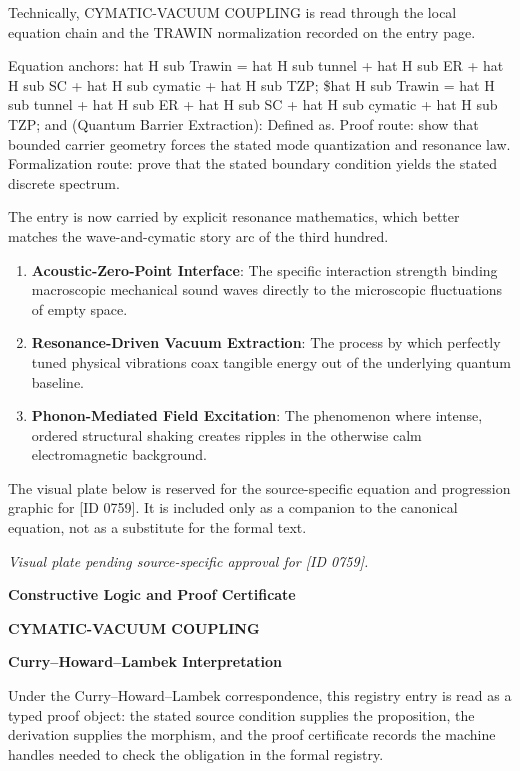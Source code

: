 Technically, CYMATIC-VACUUM COUPLING is read through the local equation chain and the TRAWIN normalization recorded on the entry page.

Equation anchors: hat H sub Trawin = hat H sub tunnel + hat H sub ER + hat H sub SC + hat H sub cymatic + hat H sub TZP; \$hat H sub Trawin = hat H sub tunnel + hat H sub ER + hat H sub SC + hat H sub cymatic + hat H sub TZP; and (Quantum Barrier Extraction): Defined as. Proof route: show that bounded carrier geometry forces the stated mode quantization and resonance law. Formalization route: prove that the stated boundary condition yields the stated discrete spectrum.

The entry is now carried by explicit resonance mathematics, which better matches the wave-and-cymatic story arc of the third hundred.
\endgroup

\begin{enumerate}[leftmargin=1.6em,itemsep=6pt,topsep=4pt]
\item \textbf{Acoustic-Zero-Point Interface}: The specific interaction strength binding macroscopic mechanical sound waves directly to the microscopic fluctuations of empty space.
\item \textbf{Resonance-Driven Vacuum Extraction}: The process by which perfectly tuned physical vibrations coax tangible energy out of the underlying quantum baseline.
\item \textbf{Phonon-Mediated Field Excitation}: The phenomenon where intense, ordered structural shaking creates ripples in the otherwise calm electromagnetic background.
\end{enumerate}

\begingroup\footnotesize\sloppy
The visual plate below is reserved for the source-specific equation and progression graphic for [ID 0759]. It is included only as a companion to the canonical equation, not as a substitute for the formal text.
\par\endgroup
\begingroup\footnotesize\itshape
Visual plate pending source-specific approval for [ID 0759].
\par\endgroup

\clearpage
\begingroup\tzpsupportsetup
\noindent\textbf{\fontsize{10.8pt}{12.8pt}\selectfont [ID 0759] Constructive Logic and Proof Certificate}\par
\noindent\textbf{\fontsize{10pt}{12pt}\selectfont CYMATIC-VACUUM COUPLING}\par
\vspace{0.45em}
\begingroup
\footnotesize
\setlength{\parskip}{0.22em}
\setlength{\parindent}{0pt}
\noindent\textbf{Curry--Howard--Lambek Interpretation}\par
Under the Curry--Howard--Lambek correspondence, this registry entry is read as a typed proof
object: the stated source condition supplies the proposition, the derivation supplies the
morphism, and the proof certificate records the machine handles needed to check the obligation
in the formal registry.

